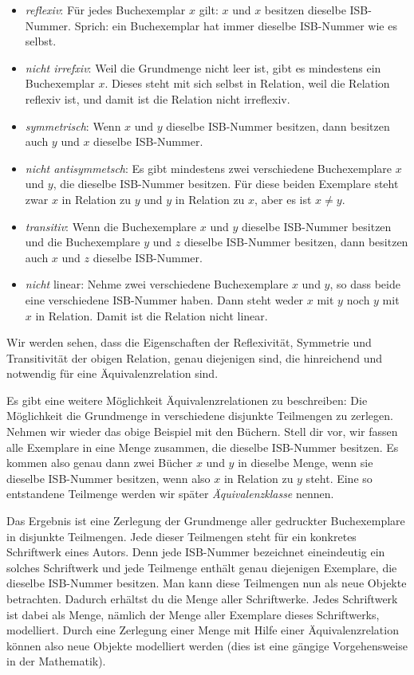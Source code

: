 \begin{itemize}
\item  \textit{reflexiv}: Für jedes Buchexemplar $x$ gilt: $x$ und $x$ besitzen dieselbe ISB-Nummer. Sprich: ein Buchexemplar hat immer dieselbe ISB-Nummer wie es selbst.
\item  \textit{nicht irrefxiv}: Weil die Grundmenge nicht leer ist, gibt es mindestens ein Buchexemplar $x$. Dieses steht mit sich selbst in Relation, weil die Relation reflexiv ist, und damit ist die Relation nicht irreflexiv.
\item  \textit{symmetrisch}: Wenn $x$ und $y$ dieselbe ISB-Nummer besitzen, dann besitzen auch $y$ und $x$ dieselbe ISB-Nummer.
\item  \textit{nicht antisymmetsch}: Es gibt mindestens zwei verschiedene Buchexemplare $x$ und $y$, die dieselbe ISB-Nummer besitzen. Für diese beiden Exemplare steht zwar $x$ in Relation zu $y$ und $y$ in Relation zu $x$, aber es ist $x\ne y$.
\item  \textit{transitiv}: Wenn die Buchexemplare $x$ und $y$ dieselbe ISB-Nummer besitzen und die Buchexemplare $y$ und $z$ dieselbe ISB-Nummer besitzen, dann besitzen auch $x$ und $z$ dieselbe ISB-Nummer.
\item  \textit{nicht }linear: Nehme zwei verschiedene Buchexemplare $x$ und $y$, so dass beide eine verschiedene ISB-Nummer haben. Dann steht weder $x$ mit $y$ noch $y$ mit $x$ in Relation. Damit ist die Relation nicht linear.
\end{itemize}

Wir werden sehen, dass die Eigenschaften der Reflexivität, Symmetrie und Transitivität der obigen Relation, genau diejenigen sind, die hinreichend und notwendig für eine Äquivalenzrelation sind.

Es gibt eine weitere Möglichkeit Äquivalenzrelationen zu beschreiben: Die Möglichkeit die Grundmenge in verschiedene disjunkte Teilmengen zu zerlegen. Nehmen wir wieder das obige Beispiel mit den Büchern. Stell dir vor, wir fassen alle Exemplare in eine Menge zusammen, die dieselbe ISB-Nummer besitzen. Es kommen also genau dann zwei Bücher $x$ und $y$ in dieselbe Menge, wenn sie dieselbe ISB-Nummer besitzen, wenn also $x$ in Relation zu $y$ steht. Eine so entstandene Teilmenge werden wir später \textit{Äquivalenzklasse} nennen.

Das Ergebnis ist eine Zerlegung der Grundmenge aller gedruckter Buchexemplare in disjunkte Teilmengen. Jede dieser Teilmengen steht für ein konkretes Schriftwerk eines Autors. Denn jede ISB-Nummer bezeichnet eineindeutig ein solches Schriftwerk und jede Teilmenge enthält genau diejenigen Exemplare, die dieselbe ISB-Nummer besitzen. Man kann diese Teilmengen nun als neue Objekte betrachten. Dadurch erhältst du die Menge aller Schriftwerke. Jedes Schriftwerk ist dabei als Menge, nämlich der Menge aller Exemplare dieses Schriftwerks, modelliert. Durch eine Zerlegung einer Menge mit Hilfe einer Äquivalenzrelation können also neue Objekte modelliert werden (dies ist eine gängige Vorgehensweise in der Mathematik).



